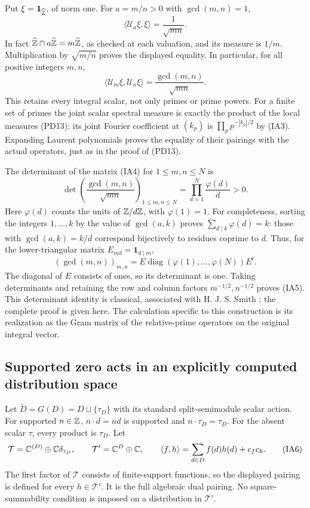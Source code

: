 Put $\xi=\mathbf1_{\widehat{\mathbb Z}}$, of norm one. For $a=m/n>0$ with
$\gcd(m,n)=1$,
\[
 \langle\mathcal U_a\xi,\xi\rangle=\frac1{\sqrt{mn}}.
 \tag{IA3}
\]
In fact $\widehat{\mathbb Z}\cap a\widehat{\mathbb Z}=m\widehat{\mathbb Z}$, as checked
at each valuation, and its measure is $1/m$. Multiplication by
$\sqrt{m/n}$ proves the displayed equality. In particular, for all
positive integers $m,n$,
\[
 \langle\mathcal U_m\xi,\mathcal U_n\xi\rangle
 =\frac{\gcd(m,n)}{\sqrt{mn}}.
 \tag{IA4}\label{eq:IA-gcd-Gram}
\]
This retains every integral scalar, not only primes or prime powers.
For a finite set of primes the joint scalar spectral measure is exactly
the product of the local measures (PD13): its joint Fourier coefficient
at $(k_p)$ is $\prod_pp^{-|k_p|/2}$ by (IA3). Expanding Laurent
polynomials proves the equality of their pairings with the actual
operators, just as in the proof of (PD13).

The determinant of the matrix (IA4) for $1\le m,n\le N$ is
\[
 \det\left(\frac{\gcd(m,n)}{\sqrt{mn}}\right)_{1\le m,n\le N}
 =\prod_{d=1}^N\frac{\varphi(d)}d>0.
 \tag{IA5}
\]
Here $\varphi(d)$ counts the units of $\mathbb Z/d\mathbb Z$, with $\varphi(1)=1$.
For completeness, sorting the integers $1,\ldots,k$ by the value of
$\gcd(a,k)$ proves $\sum_{d\mid k}\varphi(d)=k$: those with
$\gcd(a,k)=k/d$ correspond bijectively to residues coprime to $d$.
Thus, for the lower-triangular matrix $E_{md}=\mathbf1_{d\mid m}$,
\[
 (\gcd(m,n))_{m,n}=E\operatorname{diag}(\varphi(1),\ldots,\varphi(N))E^t.
\]
The diagonal of $E$ consists of ones, so its determinant is one.
Taking determinants and retaining the row and column factors
$m^{-1/2},n^{-1/2}$ proves (IA5).
This determinant identity is classical, associated with H. J. S. Smith
\cite{Smith1875}; the complete proof is given here. The calculation
specific to this construction is its realization as the Gram matrix
of the relative-prime operators on the original integral vector.

\subsection{Supported zero acts in an explicitly computed distribution space}
Let $\widetilde D=G(D)=D\sqcup\{\tau_D\}$ with its standard
split-semimodule scalar action. For supported $n\in\mathbb Z$,
$n\cdot d=nd$ is supported and $n\cdot\tau_D=\tau_D$.
For the absent scalar $\tau$, every product is $\tau_D$.
Let
\[
 \mathcal T=\mathbb C^{(D)}\oplus\mathbb C\delta_{\tau_D},\qquad
 \mathcal T'=\mathbb C^D\oplus\mathbb C,
 \qquad \langle f,h\rangle=\sum_{d\in D}f(d)h(d)+c_f c_h.
 \tag{IA6}
\]
The first factor of $\mathcal T$ consists of finite-support functions,
so the displayed pairing is defined for every $h\in\mathcal T'$.
It is the full algebraic dual pairing. No square-summability condition
is imposed on a distribution in $\mathcal T'$.

